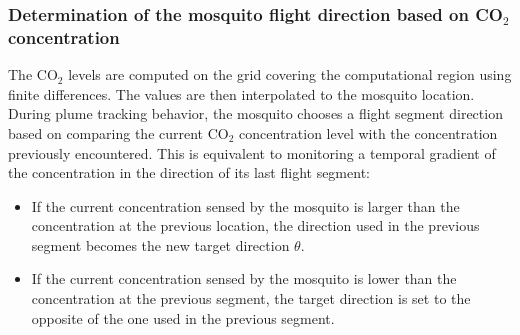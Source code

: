 \documentclass[10pt]{article}
\begin{document}
\subsubsection*{Determination of the mosquito flight direction based on CO$_2$ concentration}
The CO$_2$ levels are computed on the grid covering the computational region 
using finite differences.  The values are then interpolated to the mosquito location.  
During plume tracking behavior, the mosquito chooses a flight segment direction based on comparing the current CO$_2$ concentration level
with the concentration previously encountered. This is equivalent to monitoring a temporal 
gradient of the concentration in the direction of its last flight segment:
\begin{itemize}
\item
If the current concentration sensed by the mosquito is larger than the concentration at the 
previous location, the direction used in the previous segment becomes the new target direction $\theta$.
\item
If the current concentration sensed by the mosquito is lower than the concentration at the 
previous segment, the target direction is set to the opposite of the one used in the previous segment.
\end{itemize}
\end{document}
